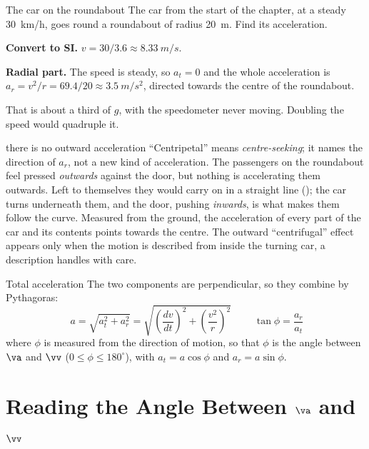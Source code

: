 \begin{exbox}{The car on the roundabout}
The car from the start of the chapter, at a steady \SI{30}{km/h}, goes round a roundabout of
radius \SI{20}{m}. Find its acceleration.

 \textbf{Convert to SI.} $v=30/3.6\approx\SI{8.33}{m/s}$.

 \textbf{Radial part.} The speed is steady, so $a_t=0$ and the whole acceleration is
$a_r=v^2/r=69.4/20\approx\SI{3.5}{m/s^2}$, directed towards the centre of the roundabout.

That is about a third of $g$, with the speedometer never moving. Doubling the speed would quadruple it.
\end{exbox}

\begin{trapbox}{there is no outward acceleration}
``Centripetal'' means \emph{centre-seeking}; it names the direction of $a_r$, not a new kind of
acceleration. The passengers on the roundabout feel pressed \emph{outwards} against the door, but
nothing is accelerating them outwards. Left to themselves they would carry on in a straight line
(); the car turns underneath them, and the door, pushing \emph{inwards}, is what makes
them follow the curve. Measured from the ground, the acceleration of every part of the car and its
contents points towards the centre. The outward ``centrifugal'' effect appears only when the motion is
described from inside the turning car, a description  handles with care.
\end{trapbox}

\begin{keybox}{Total acceleration}
The two components are perpendicular, so they combine by Pythagoras:
\[
\boxed{\;a=\sqrt{a_t^{2}+a_r^{2}}=\sqrt{\left(\frac{dv}{dt}\right)^{2}+\left(\frac{v^{2}}{r}\right)^{2}}\;}
\qquad
\tan\phi=\frac{a_r}{a_t}
\]
where $\phi$ is measured from the direction of motion, so that $\phi$ is the angle between $\va$ and
$\vv$ ($0\le\phi\le180^\circ$), with $a_t=a\cos\phi$ and $a_r=a\sin\phi$.
\end{keybox}

\section{\texorpdfstring{Reading the Angle Between $\va$ and $\vv$}{Reading the Angle Between a and v}}\label{sec:angleav}

